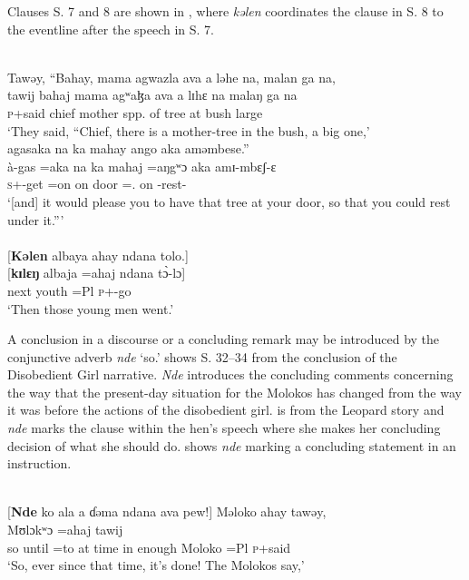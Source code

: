 Clauses S. 7 and 8 are shown in , where \textit{kəlen} coordinates the clause in S. 8 to the eventline after the speech in S. 7.

\ea \label{ex:12:57}
\\
Tawəy, “Bahay, mama agwazla ava a ləhe na, malan ga na,\\  
\gll  tawij  bahaj mama agʷaɮa ava a lɪhɛ na malaŋ ga na\\ 
      \textsc{p}+said  chief mother {spp. of tree} {\EXT} at bush {\PSP} large {\ADJ} {\PSP}\\ 
\glt ‘They said, “Chief, there is a mother-tree in the bush,  a big one,’\\

\medskip
agasaka na ka mahay ango aka aməmbese.”\\
\gll à-gas =aka na ka mahaj =aŋgʷɔ aka amɪ-mbɛʃ-ɛ\\ 
     \textsc{s}+{\PFV}-get =on  {\PSP}  on door  ={\twoS}.{\POSS} on {\DEP}-rest{}-{\CL}\\
\glt  ‘[and] it would please you to have that tree at your door, so that you could rest under it.”’\\

\medskip
{}\\
{}[\textbf{Kəlen} albaya ahay ndana  tolo.]\\
\gll  {}[\textbf{kɪlɛŋ} albaja =ahaj ndana t\`{ɔ}-lɔ]\\
      next    youth  =Pl  {\DEM}  \textsc{p}+{\PFV}-go\\
\glt  ‘Then those young men went.’ 
\z 

A conclusion in a discourse or a concluding remark may be introduced by the conjunctive adverb \textit{nde} ‘so.’  shows S. 32--34 from the conclusion of the Disobedient Girl narrative.  \textit{Nde} introduces the concluding comments concerning the way that the present-day situation for the Molokos has changed from the way it was before the actions of the disobedient girl.  is from the Leopard story \citep{Friesen2003} and \textit{nde} marks the clause within the hen’s speech where she makes her concluding decision of what she should do.  shows \textit{nde} marking a concluding statement in an instruction. 

\ea \label{ex:12:58}
\\
{}[\textbf{Nde} ko  ala  a  ɗəma  ndana    ava  pew!]  Məloko  ahay  tawəy,\\  
\gll  [\textbf{ndɛ} kʷɔ =ala  a ɗəma ndana ava pɛw] Mʊlɔkʷɔ =ahaj tawij \\
      so until =to at  time {\DEM} in enough  Moloko =Pl \textsc{p}+said\\ 
\glt ‘So, ever since that time, it’s done!  The Molokos say,’\\      
      
